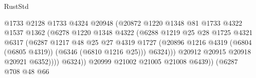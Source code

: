 \begin{lexlean}{RustStd}
\begin{coremodule}
                                          @1733
                                          @2128
                                          @1733
                                          @4324
                                          @20948
                                          (@20872
                                            @1220
                                            @1348
                                            @81
                                            @1733
                                            @4322
                                            @1537
                                            @1362
                                            (@6278
                                              @1220
                                              @1348
                                              @4322
                                              (@6288
                                                @1219
                                                @25
                                                @28
                                                @1725
                                                @4321
                                                @6317
                                                (@6287
                                                  @1217
                                                  @48
                                                  @25
                                                  @27
                                                  @4319
                                                  @1727
                                                  (@20896
                                                    @1216
                                                    @4319
                                                    (@6804 (@6805 @4319))
                                                    (@6346 (@6810 @1216 @25)))
                                                  @6324)))
                                            @20912
                                            @20915
                                            @20918
                                            @20921
                                            @6352))))
                                    @6324))
                                @20999
                                @21002
                                @21005
                                @21008
                                @6439))
                            (@6287
                              @708
                              @48
                              @66

\end{coremodule}
\end{lexlean}
